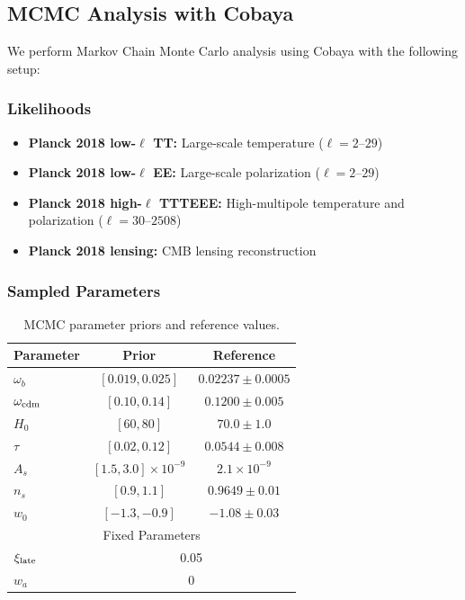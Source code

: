 \documentclass[twocolumn,showpacs,preprintnumbers,amsmath,amssymb,prd]{revtex4-2}
\begin{document}
\subsection{MCMC Analysis with Cobaya}

We perform Markov Chain Monte Carlo analysis using Cobaya \cite{Cobaya2021} with the following setup:

\subsubsection{Likelihoods}

\begin{itemize}
    \item \textbf{Planck 2018 low-$\ell$ TT:} Large-scale temperature ($\ell = 2$--$29$)
    \item \textbf{Planck 2018 low-$\ell$ EE:} Large-scale polarization ($\ell = 2$--$29$)
    \item \textbf{Planck 2018 high-$\ell$ TTTEEE:} High-multipole temperature and polarization ($\ell = 30$--$2508$)
    \item \textbf{Planck 2018 lensing:} CMB lensing reconstruction
\end{itemize}

\subsubsection{Sampled Parameters}

\begin{table}[h]
\centering
\begin{tabular}{lcc}
\toprule
Parameter & Prior & Reference \\
\midrule
$\omega_b$ & $[0.019, 0.025]$ & $0.02237 \pm 0.0005$ \\
$\omega_{\rm cdm}$ & $[0.10, 0.14]$ & $0.1200 \pm 0.005$ \\
$H_0$ & $[60, 80]$ & $70.0 \pm 1.0$ \\
$\tau$ & $[0.02, 0.12]$ & $0.0544 \pm 0.008$ \\
$A_s$ & $[1.5, 3.0] \times 10^{-9}$ & $2.1 \times 10^{-9}$ \\
$n_s$ & $[0.9, 1.1]$ & $0.9649 \pm 0.01$ \\
$w_0$ & $[-1.3, -0.9]$ & $-1.08 \pm 0.03$ \\
\midrule
\multicolumn{3}{c}{Fixed Parameters} \\
\midrule
$\xi_{\rm late}$ & \multicolumn{2}{c}{0.05} \\
$w_a$ & \multicolumn{2}{c}{0} \\
\bottomrule
\end{tabular}
\caption{MCMC parameter priors and reference values.}
\label{tab:params}
\end{table}
\end{document}
